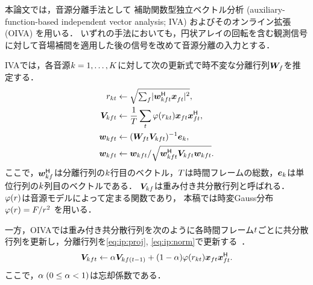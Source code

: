 \documentclass{article}
\begin{document}
本論文では，音源分離手法として
補助関数型独立ベクトル分析 (auxiliary-function-based independent vector analysis; IVA) \cite{Ono:2011:WASPAA}
およびそのオンライン拡張 (OIVA) \cite{Taniguchi:2014:HSCMA} を用いる．
いずれの手法においても，円状アレイの回転を含む観測信号に対して音場補間を適用した後の信号を改めて音源分離の入力とする．

IVAでは，各音源$k = 1, \dots, K$に対して次の更新式で時不変な分離行列$\bm{W} _{f}$を推定する．
\begin{align}
  \srcvar _{\src\tframe} &\gets \sqrt{\textstyle\sum _{\freq} \lvert \demix ^{\hermite} _{\src\ft} \obs ^{\nohermite}_{\ft} \rvert ^2}, \\
  \cov _{\src\ft} &\gets \frac{1}{\Tframe} \sum _{\tframe} \weight (\srcvar_{\src\tframe}) \obs _{\ft} \obs _{\ft}^{\hermite}, \\
  \demix _{\src\ft} &\gets (\Demix _{\ft} \cov _{\src\ft}) ^{-1} \bm{e} _{\src} \label{eq:ip:proj}, \\
  \demix _{\src\ft} &\gets {\demix _{\src\ft}} / {\sqrt{\demix _{\src\ft} ^{\hermite} \cov _{\src\ft} \demix _{\src\ft}}} \label{eq:ip:norm}.
\end{align}
ここで，$\bm{w} _{kf}^{\mathsf{H}}$は分離行列の$k$行目のベクトル，$T$は時間フレームの総数，$\bm{e}_{k}$は単位行列の$k$列目のベクトルである．
$\bm{V} _{kf}$は{重み付き共分散行列}と呼ばれる．
$\varphi(r)$は音源モデルによって定まる関数であり，
本稿では時変Gauss分布$\varphi (r) = F/{r ^2}$ \cite{Ono:2012:APSIPA}を用いる．

一方，OIVAでは重み付き共分散行列を次のように各時間フレーム$t$ごとに共分散行列を更新し，分離行列を\cref{eq:ip:proj}, \cref{eq:ip:norm}で更新する~\cite{Taniguchi:2014:HSCMA}．
\begin{equation}
  \bm{V} _{kft} \gets \alpha \bm{V} _{kf(t-1)} + (1 - \alpha) \varphi ({r _{kt}}) \bm{x} _{ft} \bm{x} _{ft}^{\mathsf{H}}.
\end{equation}
ここで，$\alpha\; (0 \leq \alpha < 1)$は忘却係数である．
\end{document}
